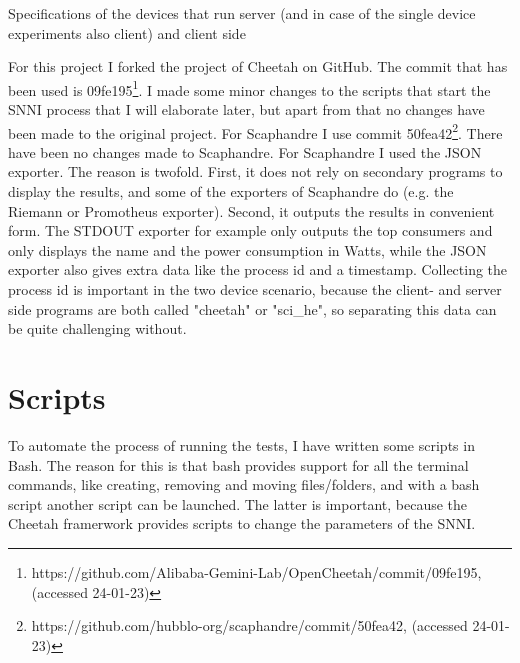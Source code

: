 \documentclass[../thesis.tex]{subfiles}
\begin{document}
\begin{table}[]
    \begin{adjustbox}{width=\columnwidth,center}
        
    \end{adjustbox}
    \caption{Specifications of the devices that run server (and in case of the single device experiments also client) and client side}
    \label{table:specs}
\end{table}

For this project I forked the project of Cheetah on GitHub. The commit that has been used is 09fe195\footnote{https://github.com/Alibaba-Gemini-Lab/OpenCheetah/commit/09fe195,  (accessed 24-01-23)}. I made some minor changes to the scripts that start the SNNI process that I will elaborate later, but apart from that no changes have been made to the original project. For Scaphandre I use commit 50fea42\footnote{https://github.com/hubblo-org/scaphandre/commit/50fea42, (accessed 24-01-23)}. There have been no changes made to Scaphandre. For Scaphandre I used the JSON exporter. The reason is twofold. First, it does not rely on secondary programs to display the results, and some of the exporters of Scaphandre do (e.g. the Riemann or Promotheus exporter). Second, it outputs the results in convenient form. The STDOUT exporter for example only outputs the top consumers and only displays the name and the power consumption in Watts, while the JSON exporter also gives extra data like the process id and a timestamp. Collecting the process id is important in the two device scenario, because the client- and server side programs are both called "cheetah" or "sci\_he", so separating this data can be quite challenging without.     

\section{Scripts}
To automate the process of running the tests, I have written some scripts in Bash. The reason for this is that bash provides support for all the terminal commands, like creating, removing and moving files/folders, and with a bash script another script can be launched. The latter is important, because the Cheetah framerwork provides scripts to change the parameters of the SNNI.
\end{document}
